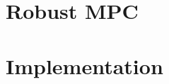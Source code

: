 \documentclass[layout=summary, columns=4,secnumdepth=2,tight]{sst-custom}
\begin{document}
		\section{Robust MPC}
		
		\section{Implementation}
		
		\iftoggle{do-multicol}{\end{multicols*}}{}
\end{document}
